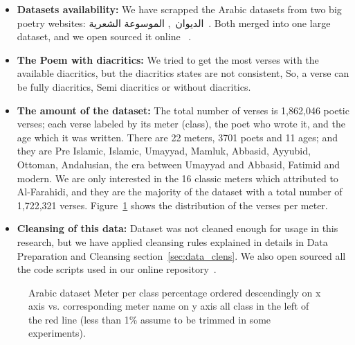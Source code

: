 \begin{itemize}

  \item \textbf{Datasets availability:} We have scrapped the Arabic datasets from two big poetry websites: \textarabic{الديوان}~\cite{diwan}, \textarabic{الموسوعة الشعرية}~\cite{PoetryEncyclopedia2016}. Both merged into one large dataset, and we open sourced it online ~\cite{ArabicpoetryDS}.

  \item \textbf{The Poem with diacritics:} We tried to get the most verses with the available diacritics, but the diacritics states are not consistent, So, a verse can be fully diacritics, Semi diacritics or without diacritics.

\item \textbf{The amount of the dataset:} The total number of verses is 1,862,046 poetic verses; each verse labeled by its meter (class), the poet who wrote it, and the age which it was written. There are 22 meters, 3701 poets and 11 ages; and they are Pre Islamic, Islamic, Umayyad, Mamluk, Abbasid, Ayyubid, Ottoman, Andalusian, the era between Umayyad and Abbasid, Fatimid and modern. We are only interested in the 16 classic meters which attributed to Al-Farahidi, and they are the majority of the dataset with a total number of 1,722,321 verses. Figure~\ref{fig:data_size_distribution} shows the distribution of the verses per meter. %
  
\item \textbf{Cleansing of this data:} Dataset was not cleaned enough for usage in this research, but we have applied cleansing rules explained in details in Data Preparation and Cleansing section~\ref{sec:data_clens}. We also open sourced all the code scripts used in our online repository~\cite{HCILAB_ArabicPoetry_2018}.
\end{itemize}

\begin{figure}
	\centering
	\begin{tikzpicture}[scale=1.2]
	
	\end{tikzpicture}%
	\caption{Arabic dataset Meter per class percentage ordered descendingly on x axis vs. corresponding meter name on y axis all class in the left of the red line (less than 1\% assume to be trimmed in some experiments).	}\label{fig:data_size_distribution}
\end{figure}


